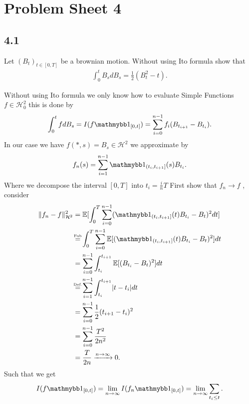\chapter{Problem Sheet 4}
\section{4.1}
\begin{question}
  Let $(B_t)_{t \in  [0,T]}$ be a brownian motion. Without using Ito formula show that 
  \begin{align*}
    \int_0^{t} B_s dB_s = \frac{1}{2}(B_t^2 - t) 
  .\end{align*}
\end{question}
\begin{solution}
  Without using Ito formula we only know how to evaluate Simple Functions $f \in  \mathcal{H}_0^{2} $ this is done by 
  \begin{align*}
    \int_0^{t}  f d B_s = I(f \cha_{[0,t]}) = \sum_{i=0}^{n-1} f_i(B_{t_{i+1}} - B_{t_i})
  .\end{align*}
  In our case we have $f(*,s) = B_s \in  \mathcal{H}^2$ we approximate by 
  \begin{align*}
  f_n(s) = \sum_{i=1}^{n-1} \cha_{(t_{i},t_{i+1}]}(s)B_{t_i} 
  .\end{align*}
  Where we decompose the interval $[0,T]$ into $t_i = \frac{i}{n}T$
  First show that $f_n \to  f$ , consider 
  \begin{align*}
    \|f_n - f\|_{\mathcal{H}^2}^2 &= \E[\int_0^{T} \sum_{i=0}^{n-1} (\cha_{(t_{i},t_{i+1}]}(t)B_{t_i}-B_t)^2 dt  ] \\
                                  &\myS{Fub}{=} \int_{0}^{T} \sum_{i=0}^{n-1} \E[(\cha_{(t_{i},t_{i+1}]}(t)B_{t_i}-B_t)^2]  dt \\
                                  &= \sum_{i=0}^{n-1} \int_{t_i}^{t_{i+1}} \E[(B_{t_i}-B_t)^2]  dt \\
                                  &\myS{Def.}{=}  \sum_{i=1}^{n-1} \int_{t_i}^{t_{i+1}} \abs{t-t_i}  dt \\
                                  &=\sum_{i=0}^{n-1} \frac{1}{2}(t_{i+1}-t_{i})^2 \\
                                  &= \sum_{i=0}^{n-1} \frac{T^2}{2n^2} \\
                                  &= \frac{T}{2n} \xrightarrow{n \to \infty} 0
  .\end{align*}
  Such that we get 
  \begin{align*}
    I(f \cha_{[0,t]}) = \lim_{n\to \infty} I(f_n \cha_{[0,t]}) = \lim_{n\to \infty} \sum_{t_i \le  t} 
  .\end{align*}
\end{solution}
